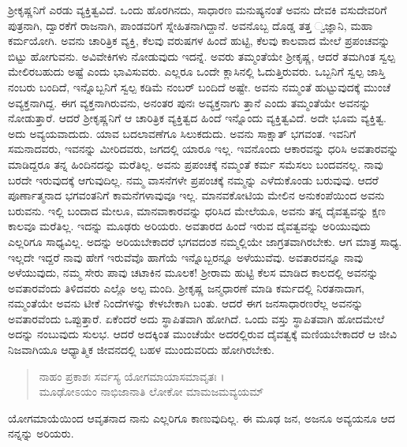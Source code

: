 ಶ್ರೀಕೃಷ್ಣನಿಗೆ ಎರಡು ವ್ಯಕ್ತಿತ್ವವಿದೆ. ಒಂದು ಹೊರಗಿನದು, ಸಾಧಾರಣ ಮನುಷ್ಯನಂತೆ ಅವನು ದೇವಕಿ ವಸುದೇವರಿಗೆ ಪುತ್ರನಾಗಿ, ದ್ವಾರಕೆಗೆ ರಾಜನಾಗಿ, ಪಾಂಡವರಿಗೆ ಸ್ನೇಹಿತನಾಗಿದ್ದಾನೆ. ಅವನೊಬ್ಬ ದೊಡ್ಡ ತತ್ತ ್ವಜ್ಞಾನಿ, ಮಹಾ ಕರ್ಮಯೋಗಿ. ಅವನು ಚಾರಿತ್ರಿಕ ವ್ಯಕ್ತಿ, ಕೆಲವು ವರುಷಗಳ ಹಿಂದೆ ಹುಟ್ಟಿ, ಕೆಲವು ಕಾಲವಾದ ಮೇಲೆ ಪ್ರಪಂಚವನ್ನು ಬಿಟ್ಟು ಹೋಗುವನು. ಅವಿವೇಕಿಗಳು ನೋಡುವುದು ಇದನ್ನೆ. ಅವರು ತಮ್ಮಂತೆಯೇ ಶ್ರೀಕೃಷ್ಣ, ಆದರೆ ತಮಗಿಂತ ಸ್ವಲ್ಪ ಮೇಲಿರಬಹುದು ಅಷ್ಟೆ ಎಂದು ಭಾವಿಸುವರು. ಎಲ್ಲರೂ ಒಂದೇ ಕ್ಲಾಸಿನಲ್ಲಿ ಓದುತ್ತಿರುವರು. ಒಬ್ಬನಿಗೆ ಸ್ವಲ್ಪ ಜಾಸ್ತಿ ನಂಬರು ಬಂದಿದೆ, ಇನ್ನೊಬ್ಬನಿಗೆ ಸ್ವಲ್ಪ ಕಡಿಮೆ ನಂಬರ್ ಬಂದಿದೆ ಅಷ್ಟೇ. ಅವನು ನಮ್ಮಂತೆ ಹುಟ್ಟುವುದಕ್ಕೆ ಮುಂಚೆ ಅವ್ಯಕ್ತನಾಗಿದ್ದ. ಈಗ ವ್ಯಕ್ತನಾಗಿರುವನು, ಅನಂತರ ಪುನಃ ಅವ್ಯಕ್ತನಾಗು ತ್ತಾನೆ ಎಂದು ತಮ್ಮಂತೆಯೇ ಅವನನ್ನು ನೋಡುತ್ತಾರೆ. ಆದರೆ ಶ್ರೀಕೃಷ್ಣನಿಗೆ ಆ ಚಾರಿತ್ರಿಕ ವ್ಯಕ್ತಿತ್ವದ ಹಿಂದೆ ಇನ್ನೊಂದು ವ್ಯಕ್ತಿತ್ವವಿದೆ. ಅದೇ ಭೂಮ ವ್ಯಕ್ತಿತ್ವ. ಅದು ಅವ್ಯಯವಾದುದು. ಯಾವ ಬದಲಾವಣೆಗೂ ಸಿಲುಕದುದು. ಅವನು ಸಾಕ್ಷಾತ್ ಭಗವಂತ. ಇವನಿಗೆ ಸಮನಾದವರು, ಇವನನ್ನು ಮೀರಿದವರು, ಜಗದಲ್ಲಿ ಯಾರೂ ಇಲ್ಲ. ಇವನೊಂದು ಆಕಾರವನ್ನು ಧರಿಸಿ ಅವತಾರವನ್ನು ಮಾಡಿದ್ದರೂ ತನ್ನ ಹಿಂದಿನದನ್ನು ಮರೆತಿಲ್ಲ. ಅವನು ಪ್ರಪಂಚಕ್ಕೆ ನಮ್ಮಂತೆ ಕರ್ಮ ಸಮೆಸಲು ಬಂದವನಲ್ಲ. ನಾವು ಬರದೇ ಇರುವುದಕ್ಕೆ ಆಗುವುದಿಲ್ಲ. ನಮ್ಮ ವಾಸನೆಗಳೇ ಪ್ರಪಂಚಕ್ಕೆ ನಮ್ಮನ್ನು ಎಳೆದುಕೊಂಡು ಬರುವುವು. ಆದರೆ ಪೂರ್ಣಾತ್ಮನಾದ ಭಗವಂತನಿಗೆ ಕಾಮನೆಗಳಾವುವೂ ಇಲ್ಲ. ಮಾನವಕೋಟಿಯ ಮೇಲಿನ ಅನುಕಂಪೆಯಿಂದ ಅವನು ಬರುವನು. ಇಲ್ಲಿ ಬಂದಾದ ಮೇಲೂ, ಮಾನವಾಕಾರವನ್ನು ಧರಿಸಿದ ಮೇಲೆಯೂ, ಅವನು ತನ್ನ ದೈವತ್ವವನ್ನು ಕ್ಷಣ ಕಾಲವೂ ಮರೆತಿಲ್ಲ. ಇದನ್ನು ಮೂಢರು ಅರಿಯರು. ಅವತಾರದ ಹಿಂದೆ ಇರುವ ದೈವತ್ವವನ್ನು ಅರಿಯುವುದು ಎಲ್ಲರಿಗೂ ಸಾಧ್ಯವಿಲ್ಲ. ಅದನ್ನು ಅರಿಯಬೇಕಾದರೆ ಭಗವದಂಶ ನಮ್ಮಲ್ಲಿಯೇ ಜಾಗ್ರತವಾಗಿರಬೇಕು. ಆಗ ಮಾತ್ರ ಸಾಧ್ಯ. ಇಲ್ಲದೇ ಇದ್ದರೆ ನಾವು ಹೇಗೆ ಇರುವೆವೊ ಹಾಗೆಯೆ ಇನ್ನೊಬ್ಬರನ್ನೂ ಅಳೆಯುವೆವು. ಅವತಾರವನ್ನೂ ನಾವು ಅಳೆಯುವುದು, ನಮ್ಮ ಸೇರು ಪಾವು ಚಟಾಕಿನ ಮೂಲಕ! ಶ್ರೀರಾಮ ಹುಟ್ಟಿ ಕೆಲಸ ಮಾಡಿದ ಕಾಲದಲ್ಲಿ ಅವನನ್ನು ಅವತಾರವೆಂದು ತಿಳಿದವರು ಎಲ್ಲೊ ಅಲ್ಪ ಮಂದಿ. ಶ್ರೀಕೃಷ್ಣ ಜನ್ಮಧಾರಣೆ ಮಾಡಿ ಕರ್ಮದಲ್ಲಿ ನಿರತನಾದಾಗ, ನಮ್ಮಂತೆಯೇ ಅವನು ಟೀಕೆ ನಿಂದೆಗಳನ್ನು ಕೇಳಬೇಕಾಗಿ ಬಂತು. ಆದರೆ ಈಗ ಜನಸಾಧಾರಣರೆಲ್ಲ ಅವನನ್ನು ಅವತಾರವೆಂದು ಒಪ್ಪುತ್ತಾರೆ. ಏಕೆಂದರೆ ಅದು ಸ್ಥಾಪಿತವಾಗಿ ಹೋಗಿದೆ. ಒಂದು ವಸ್ತು ಸ್ಥಾಪಿತವಾಗಿ ಹೋದಮೇಲೆ ಅದನ್ನು ನಂಬುವುದು ಸುಲಭ. ಆದರೆ ಅದಕ್ಕಿಂತ ಮುಂಚೆಯೇ ಅದರಲ್ಲಿರುವ ದೈವತ್ವಕ್ಕೆ ಮಣಿಯಬೇಕಾದರೆ ಆ ಜೀವಿ ನಿಜವಾಗಿಯೂ ಆಧ್ಯಾತ್ಮಿಕ ಜೀವನದಲ್ಲಿ ಬಹಳ ಮುಂದುವರಿದು ಹೋಗಿರಬೇಕು.

\begin{verse}
ನಾಹಂ ಪ್ರಕಾಶಃ ಸರ್ವಸ್ಯ ಯೋಗಮಾಯಾಸಮಾವೃತಃ ।\\ಮೂಢೋಽಯಂ ನಾಭಿಜಾನಾತಿ ಲೋಕೋ ಮಾಮಜಮವ್ಯಯಮ್ 
\end{verse}

{\small ಯೋಗಮಾಯೆಯಿಂದ ಆವೃತನಾದ ನಾನು ಎಲ್ಲರಿಗೂ ಕಾಣುವುದಿಲ್ಲ. ಈ ಮೂಢ ಜನ, ಅಜನೂ ಅವ್ಯಯನೂ ಆದ ನನ್ನನ್ನು ಅರಿಯರು.}

